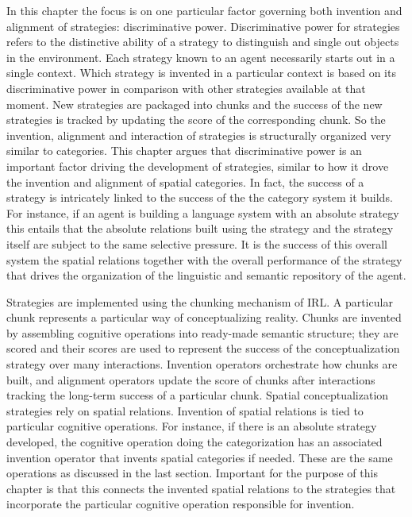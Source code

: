 In this chapter the focus is on one particular factor governing both invention and alignment 
of strategies: discriminative power. Discriminative power for strategies refers to the distinctive 
ability of a strategy to distinguish and single out objects in the environment. 
Each strategy known to an agent necessarily starts out in a single context.
Which strategy is invented in a particular context is based on its discriminative power
in comparison with other strategies available at that moment. New strategies are packaged into chunks 
and the success of the new strategies is tracked by updating the score of the corresponding 
chunk. So the invention, alignment and interaction of strategies is structurally organized
very similar to categories. This chapter argues that discriminative power
is an important factor driving the development of strategies, similar to how
it drove the invention and alignment of spatial categories. In fact, the success
of a strategy is intricately linked to the success of the the category system it builds. 
For instance, if an agent is building a language system with an absolute strategy this 
entails that the absolute relations built using the strategy and the strategy itself
are subject to the same selective pressure. It is the success
of this overall system the spatial relations together with the overall performance
of the strategy that drives the organization of the linguistic and semantic
repository of the agent.

Strategies are implemented using the chunking mechanism of IRL. A particular chunk
represents a particular way of conceptualizing reality. Chunks are invented by
assembling cognitive operations into ready-made semantic structure; they are
scored and their scores are used to represent the success of the conceptualization
strategy over many interactions. Invention operators orchestrate how chunks are
built, and alignment operators update the score of chunks after interactions tracking
the long-term success of a particular chunk. Spatial conceptualization
strategies rely on spatial relations. Invention of spatial relations is tied to particular 
cognitive operations. For instance, if there is an absolute strategy developed,
the cognitive operation doing the categorization has an associated 
invention operator that invents spatial categories if needed. These are the
same operations as discussed in the last section. Important for the purpose
of this chapter is that this connects the invented spatial relations to
the strategies that incorporate the particular cognitive operation responsible
for invention. 

